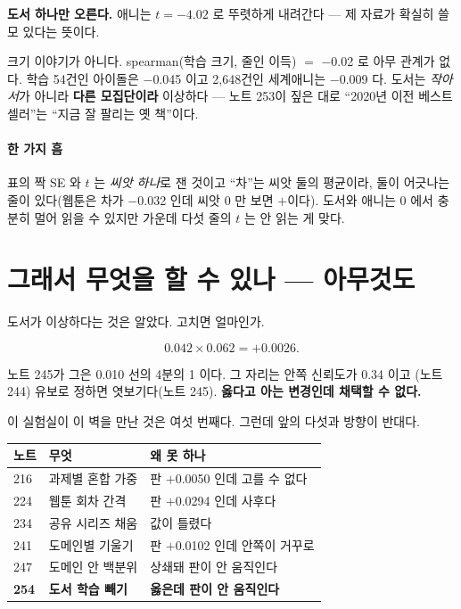\documentclass[10pt]{article}
\begin{document}
\textbf{도서 하나만 오른다.} 애니는 $t{=}-4.02$ 로 뚜렷하게 내려간다 ---
제 자료가 확실히 쓸모 있다는 뜻이다.

크기 이야기가 아니다. spearman(학습 크기, 줄인 이득) $=$ $-$0.02 로 아무
관계가 없다. 학습 54건인 아이돌은 $-$0.045 이고 2,648건인 세계애니는
$-$0.009 다. 도서는 \emph{작아서}가 아니라 \textbf{다른 모집단이라}
이상하다 --- 노트 253이 짚은 대로 ``2020년 이전 베스트셀러''는 ``지금 잘
팔리는 옛 책''이다.

\paragraph{한 가지 흠} 표의 짝 SE 와 $t$ 는 \emph{씨앗 하나}로 잰 것이고
``차''는 씨앗 둘의 평균이라, 둘이 어긋나는 줄이 있다(웹툰은 차가
$-$0.032 인데 씨앗 0 만 보면 $+$이다). 도서와 애니는 0 에서 충분히 멀어
읽을 수 있지만 가운데 다섯 줄의 $t$ 는 안 읽는 게 맞다.

\section{그래서 무엇을 할 수 있나 --- 아무것도}

도서가 이상하다는 것은 알았다. 고치면 얼마인가.

\[ 0.042 \times 0.062 = +0.0026. \]

노트 245가 그은 0.010 선의 4분의 1 이다. 그 자리는 안쪽 신뢰도가 0.34 이고
(노트 244) 유보로 정하면 엿보기다(노트 245). \textbf{옳다고 아는 변경인데
채택할 수 없다.}

이 실험실이 이 벽을 만난 것은 여섯 번째다. 그런데 앞의 다섯과 방향이 반대다.

\begin{center}\small
\begin{tabular}{lll}
\hline
노트 & 무엇 & 왜 못 하나 \\
\hline
216 & 과제별 혼합 가중 & 판 $+$0.0050 인데 고를 수 없다 \\
224 & 웹툰 회차 간격 & 판 $+$0.0294 인데 사후다 \\
234 & 공유 시리즈 채움 & 값이 틀렸다 \\
241 & 도메인별 기울기 & 판 $+$0.0102 인데 안쪽이 거꾸로 \\
247 & 도메인 안 백분위 & 상쇄돼 판이 안 움직인다 \\
\textbf{254} & \textbf{도서 학습 빼기} & \textbf{옳은데 판이 안 움직인다} \\
\hline
\end{tabular}
\end{center}
\end{document}
